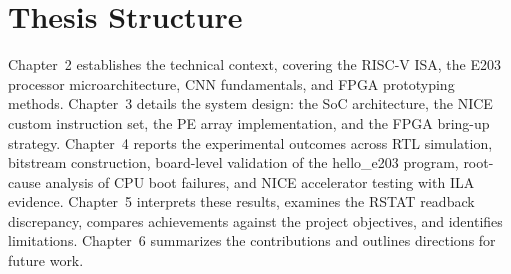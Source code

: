 \section{Thesis Structure}\label{sec:1_5}

Chapter~2 establishes the technical context, covering the RISC-V ISA, the E203 processor microarchitecture, CNN fundamentals, and FPGA prototyping methods. Chapter~3 details the system design: the SoC architecture, the NICE custom instruction set, the PE array implementation, and the FPGA bring-up strategy. Chapter~4 reports the experimental outcomes across RTL simulation, bitstream construction, board-level validation of the hello\_e203 program, root-cause analysis of CPU boot failures, and NICE accelerator testing with ILA evidence. Chapter~5 interprets these results, examines the RSTAT readback discrepancy, compares achievements against the project objectives, and identifies limitations. Chapter~6 summarizes the contributions and outlines directions for future work.


